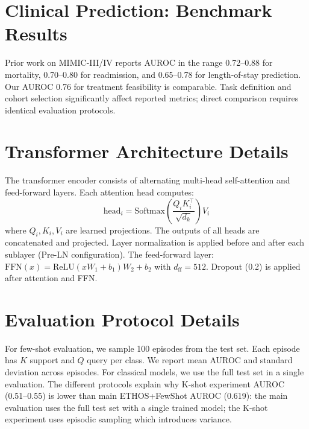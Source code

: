 \section{Clinical Prediction: Benchmark Results}

Prior work on MIMIC-III/IV reports AUROC in the range 0.72--0.88 for mortality, 0.70--0.80 for readmission, and 0.65--0.78 for length-of-stay prediction. Our AUROC 0.76 for treatment feasibility is comparable. Task definition and cohort selection significantly affect reported metrics; direct comparison requires identical evaluation protocols.

\section{Transformer Architecture Details}

The transformer encoder consists of alternating multi-head self-attention and feed-forward layers. Each attention head computes:
\begin{equation}
\text{head}_i = \text{Softmax}\left(\frac{Q_i K_i^\top}{\sqrt{d_k}}\right) V_i
\end{equation}
where $Q_i, K_i, V_i$ are learned projections. The outputs of all heads are concatenated and projected. Layer normalization is applied before and after each sublayer (Pre-LN configuration). The feed-forward layer: $\text{FFN}(x) = \text{ReLU}(xW_1 + b_1)W_2 + b_2$ with $d_{\text{ff}} = 512$. Dropout (0.2) is applied after attention and FFN.

\section{Evaluation Protocol Details}

For few-shot evaluation, we sample 100 episodes from the test set. Each episode has $K$ support and $Q$ query per class. We report mean AUROC and standard deviation across episodes. For classical models, we use the full test set in a single evaluation. The different protocols explain why K-shot experiment AUROC (0.51--0.55) is lower than main ETHOS+FewShot AUROC (0.619): the main evaluation uses the full test set with a single trained model; the K-shot experiment uses episodic sampling which introduces variance.

